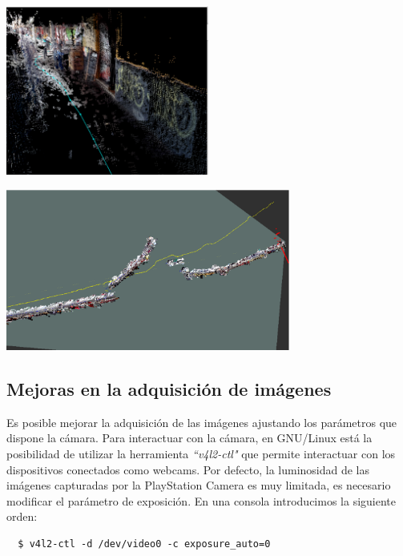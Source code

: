 \begin{minipage}{\linewidth}
    \centering
    \includegraphics[width=0.5\textwidth]{images/cap4/Exteriores-rtabmap-cerca.eps}
    \label{fig:Exteriores-Rtabmap-Cerca}
\end{minipage}

\begin{minipage}{\linewidth}
    \centering
    \includegraphics[width=0.7\textwidth]{images/cap4/Exteriores-rviz.eps}
    \label{fig:Exteriores-Rviz}
\end{minipage}


\subsection{Mejoras en la adquisición de imágenes}

Es posible mejorar la adquisición de las imágenes ajustando los parámetros que
dispone la cámara. Para interactuar con la cámara, en GNU/Linux está la
posibilidad de utilizar la herramienta \textit{``v4l2-ctl"} que permite
interactuar con los dispositivos conectados como webcams. Por defecto, la
luminosidad de las imágenes capturadas por la PlayStation Camera es muy
limitada, es necesario modificar el parámetro de exposición. En una consola
introducimos la siguiente orden:
\\
\begin{lstlisting}
  $ v4l2-ctl -d /dev/video0 -c exposure_auto=0
\end{lstlisting}


